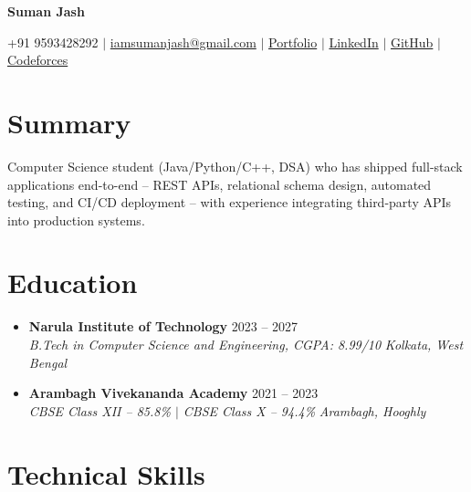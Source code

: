 \documentclass[letterpaper,10pt]{article}
\newcommand{\resumeSubheading}[4]{
\vspace{1pt}\item
\textbf{#1} \hfill #2 \\
\textit{#3} \hfill \textit{#4}
\vspace{-2pt}
}
\begin{document}
\pagestyle{empty}

\begin{center}
{\Huge \bfseries Suman Jash}\\[-1pt]
\vspace{2pt}

+91 9593428292 $|$
\href{mailto:iamsumanjash@gmail.com}{iamsumanjash@gmail.com} $|$
\href{https://portfolio-self-phi-13.vercel.app}{Portfolio} $|$
\href{https://www.linkedin.com/in/sumanjash}{LinkedIn} $|$
\href{https://github.com/suman2308}{GitHub} $|$
\href{https://codeforces.com/profile/sumanjash}{Codeforces}
\end{center}

\section{Summary}
\vspace{-1pt}
Computer Science student (Java/Python/C++, DSA) who has shipped full-stack applications end-to-end -- REST APIs, relational schema design, automated testing, and CI/CD deployment -- with experience integrating third-party APIs into production systems.
\vspace{-6pt}

\section{Education}

\begin{itemize}[
leftmargin=0.13in,
label={},
itemsep=1pt,
topsep=0pt,
parsep=0pt,
partopsep=0pt
]

\resumeSubheading
{Narula Institute of Technology}{2023 -- 2027}
{B.Tech in Computer Science and Engineering, CGPA: 8.99/10}
{Kolkata, West Bengal}

\resumeSubheading
{Arambagh Vivekananda Academy}{2021 -- 2023}
{CBSE Class XII -- 85.8\% $|$ CBSE Class X -- 94.4\%}
{Arambagh, Hooghly}

\end{itemize}
\vspace{-5pt}

\section{Technical Skills}
\end{document}
